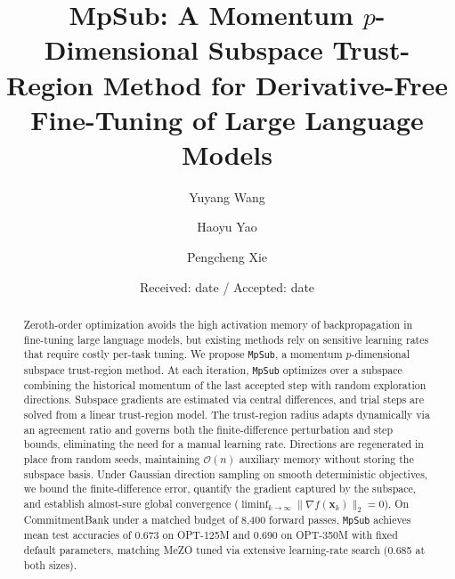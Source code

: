 \documentclass[smallextended]{svjour3}
\newcommand{\bx}{\bm{x}}
\begin{document}
\title{MpSub: A Momentum $p$-Dimensional Subspace Trust-Region Method for Derivative-Free Fine-Tuning of Large Language Models}

\author{Yuyang Wang \and Haoyu Yao \and Pengcheng Xie}


\date{Received: date / Accepted: date}

\maketitle

\begin{abstract}
Zeroth-order optimization avoids the high activation memory of backpropagation in fine-tuning large language models, but existing methods rely on sensitive learning rates that require costly per-task tuning. We propose \texttt{MpSub}, a momentum $p$-dimensional subspace trust-region method. At each iteration, \texttt{MpSub} optimizes over a subspace combining the historical momentum of the last accepted step with random exploration directions. Subspace gradients are estimated via central differences, and trial steps are solved from a linear trust-region model. The trust-region radius adapts dynamically via an agreement ratio and governs both the finite-difference perturbation and step bounds, eliminating the need for a manual learning rate. Directions are regenerated in place from random seeds, maintaining $\mathcal{O}(n)$ auxiliary memory without storing the subspace basis. Under Gaussian direction sampling on smooth deterministic objectives, we bound the finite-difference error, quantify the gradient captured by the subspace, and establish almost-sure global convergence ($\liminf_{k\to\infty} \|\nabla f(\bx_k)\|_2 = 0$). On CommitmentBank under a matched budget of 8,400 forward passes, \texttt{MpSub} achieves mean test accuracies of 0.673 on OPT-125M and 0.690 on OPT-350M with fixed default parameters, matching MeZO tuned via extensive learning-rate search (0.685 at both sizes).

\end{abstract}
\end{document}
